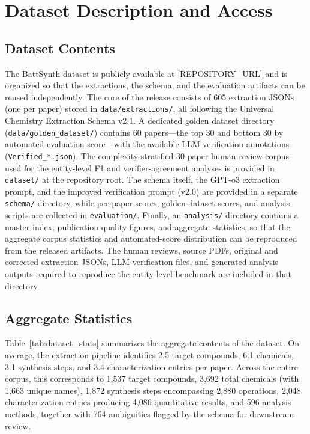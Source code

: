\documentclass[12pt,a4paper]{article}
\begin{document}
\section{Dataset Description and Access}
\label{sec:dataset}

\subsection{Dataset Contents}

The BattSynth dataset is publicly available at \url{[REPOSITORY_URL]} and is organized so that the extractions, the schema, and the evaluation artifacts can be reused independently. The core of the release consists of 605 extraction JSONs (one per paper) stored in \texttt{data/extractions/}, all following the Universal Chemistry Extraction Schema v2.1. A dedicated golden dataset directory (\texttt{data/golden\_dataset/}) contains 60 papers---the top 30 and bottom 30 by automated evaluation score---with the available LLM verification annotations (\texttt{Verified\_*.json}). The complexity-stratified 30-paper human-review corpus used for the entity-level F1 and verifier-agreement analyses is provided in \texttt{dataset/} at the repository root. The schema itself, the GPT-o3 extraction prompt, and the improved verification prompt (v2.0) are provided in a separate \texttt{schema/} directory, while per-paper scores, golden-dataset scores, and analysis scripts are collected in \texttt{evaluation/}. Finally, an \texttt{analysis/} directory contains a master index, publication-quality figures, and aggregate statistics, so that the aggregate corpus statistics and automated-score distribution can be reproduced from the released artifacts. The human reviews, source PDFs, original and corrected extraction JSONs, LLM-verification files, and generated analysis outputs required to reproduce the entity-level benchmark are included in that directory.

\subsection{Aggregate Statistics}

Table~\ref{tab:dataset_stats} summarizes the aggregate contents of the dataset. On average, the extraction pipeline identifies 2.5 target compounds, 6.1 chemicals, 3.1 synthesis steps, and 3.4 characterization entries per paper. Across the entire corpus, this corresponds to 1,537 target compounds, 3,692 total chemicals (with 1,663 unique names), 1,872 synthesis steps encompassing 2,880 operations, 2,048 characterization entries producing 4,086 quantitative results, and 596 analysis methods, together with 764 ambiguities flagged by the schema for downstream review.
\end{document}
